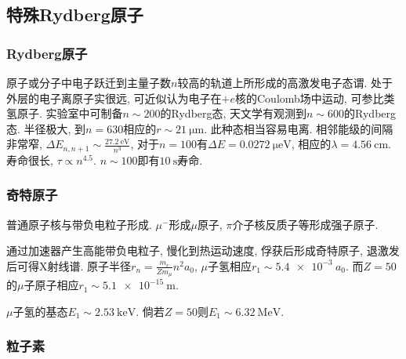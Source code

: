 \documentclass[hidelinks]{ctexart}
\begin{document}


\subsection{特殊Rydberg原子} %
\label{sub:特殊rydberg原子}

\subsubsection{Rydberg原子} %
\label{ssub:rydberg原子}

原子或分子中电子跃迁到主量子数$n$较高的轨道上所形成的高激发电子态谓. 处于外层的电子离原子实很远, 可近似认为电子在$+e$核的Coulomb场中运动, 可参比类氢原子. 实验室中可制备$n\sim 200$的Rydberg态, 天文学有观测到$n\sim 600$的Rydberg态.
\newpoint{}半径极大, 到$n=630$相应的$r\sim \SI{21}{\micro\meter}$.
\newpoint{}此种态相当容易电离.
\newpoint{}相邻能级的间隔非常窄, $\displaystyle \Delta E_{n,n+1} \sim \frac{\SI{27.2}{\eV}}{n^3}$, 对于$n=100$有$\Delta E = \SI{0.0272}{\micro\eV}$, 相应的$\lambda = \SI{4.56}{\centi\meter}$.
\newpoint{}寿命很长, $\tau \propto n^{4.5}$. $n\sim 100$即有$\SI{10}{\second}$寿命.


\subsubsection{奇特原子} %
\label{ssub:奇特原子}

普通原子核与带负电粒子形成. $\mu^-$形成$\mu$原子, $\pi$介子核反质子等形成强子原子.
\par
通过加速器产生高能带负电粒子, 慢化到热运动速度, 俘获后形成奇特原子, 退激发后可得X射线谱.
\newpoint{}原子半径$\displaystyle r_n = \frac{m_e}{Zm_\mu} n^2 a_0$, $\mu$子氢相应$r_1 \sim \SI{5.4e-3}{}a_0$. 而$Z=50$的$\mu$子原子相应$r_1 \sim \SI{5.1e-15}{\meter}$.
\par
$\mu$子氢的基态$E_1 \sim \SI{2.53}{\kilo\eV}$. 倘若$Z=50$则$E_1 \sim \SI{6.32}{\mega\eV}$.


\subsubsection{粒子素} %
\label{ssub:粒子素}
\end{document}
